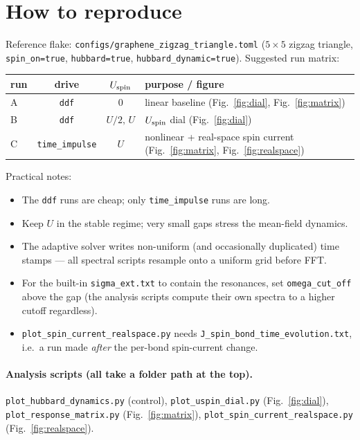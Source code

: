 \documentclass[11pt]{article}
\newcommand{\code}[1]{\texttt{\small #1}}
\begin{document}
\section{How to reproduce}
Reference flake: \code{configs/graphene\_zigzag\_triangle.toml}
($5\times5$ zigzag triangle, \code{spin\_on=true}, \code{hubbard=true},
\code{hubbard\_dynamic=true}). Suggested run matrix:
\begin{table}[h]
\centering
\begin{tabular}{lccl}
\toprule
run & drive & $U_{\rm spin}$ & purpose / figure\\
\midrule
A & \code{ddf} & 0 & linear baseline (Fig.~\ref{fig:dial}, Fig.~\ref{fig:matrix})\\
B & \code{ddf} & $U/2,\,U$ & $U_{\rm spin}$ dial (Fig.~\ref{fig:dial})\\
C & \code{time\_impulse} & $U$ & nonlinear + real-space spin current
(Fig.~\ref{fig:matrix}, Fig.~\ref{fig:realspace})\\
\bottomrule
\end{tabular}
\end{table}

\noindent Practical notes:
\begin{itemize}
\item The \code{ddf} runs are cheap; only \code{time\_impulse} runs are long.
\item Keep $U$ in the stable regime; very small gaps stress the mean-field
dynamics.
\item The adaptive solver writes non-uniform (and occasionally duplicated) time
stamps --- all spectral scripts resample onto a uniform grid before FFT.
\item For the built-in \code{sigma\_ext.txt} to contain the resonances, set
\code{omega\_cut\_off} above the gap (the analysis scripts compute their own
spectra to a higher cutoff regardless).
\item \code{plot\_spin\_current\_realspace.py} needs
\code{J\_spin\_bond\_time\_evolution.txt}, i.e.\ a run made \emph{after} the
per-bond spin-current change.
\end{itemize}

\paragraph{Analysis scripts (all take a folder path at the top).}
\code{plot\_hubbard\_dynamics.py} (control), \code{plot\_uspin\_dial.py}
(Fig.~\ref{fig:dial}), \code{plot\_response\_matrix.py} (Fig.~\ref{fig:matrix}),
\code{plot\_spin\_current\_realspace.py} (Fig.~\ref{fig:realspace}).
\end{document}
